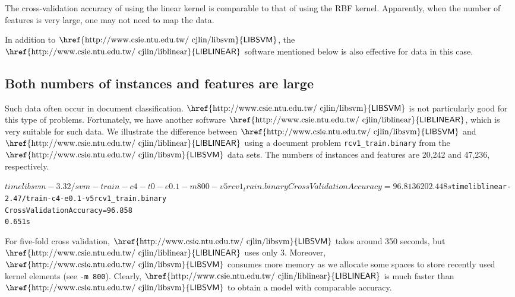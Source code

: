 \documentclass[12pt]{article}
\newcommand{\libsvm}{$\mbox{\href{http://www.csie.ntu.edu.tw/~cjlin/libsvm}{\sf LIBSVM}}$\xspace}
\newcommand{\liblinear}{$\mbox{\href{http://www.csie.ntu.edu.tw/~cjlin/liblinear}{\sf LIBLINEAR}}$\xspace}
\begin{document}
The cross-validation accuracy of using the linear kernel is comparable to that of using the
  RBF kernel. Apparently, when the number of
features is
very large, one may not need to map the data.

In addition to \libsvm, the \liblinear software
mentioned below is also effective for
data in this case.

\subsection{Both numbers of instances and features are
  large}

  Such data often occur in document classification. \libsvm is not
particularly good for this type of problems. Fortunately, we have another
  software \liblinear \citep{REF08a}, which is very suitable for such data. We
  illustrate the difference between \libsvm and \liblinear using a
  document problem
{\tt rcv1\_train.binary} from the \libsvm data sets.
The numbers of instances and features are
20,242 and 47,236, respectively.
\begin{alltt}$ time libsvm-3.32/svm-train -c 4 -t 0 -e 0.1 -m 800 -v 5 rcv1_train.binary
Cross Validation Accuracy = 96.8136%
202.448s
$ time liblinear-2.47/train -c 4 -e 0.1 -v 5 rcv1_train.binary
Cross Validation Accuracy = 96.858%
0.651s
\end{alltt}
For five-fold cross validation,
\libsvm takes around 350 seconds, but
\liblinear uses only 3. Moreover,
\libsvm consumes more memory as we
allocate some spaces to store
recently used kernel elements
(see {\tt -m 800}).
Clearly,
\liblinear is much faster
than \libsvm to obtain a model with
comparable accuracy.
\end{document}
